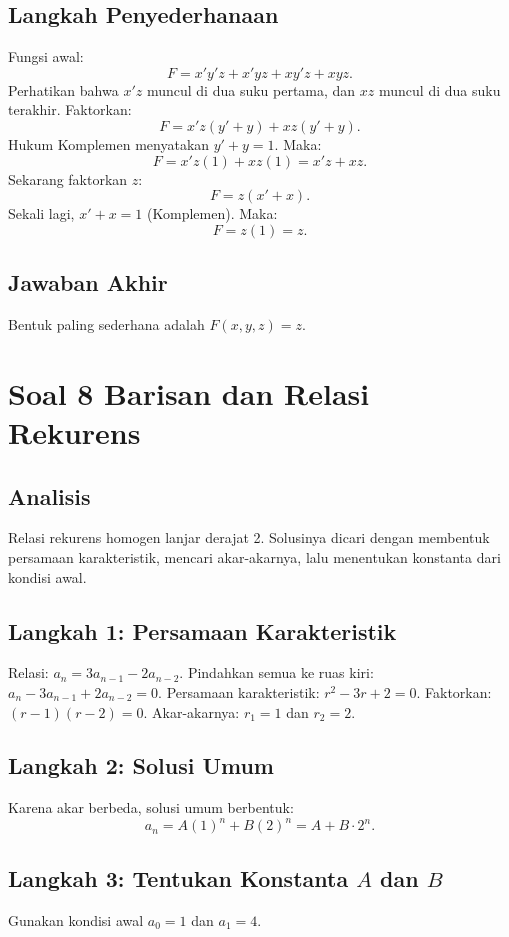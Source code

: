 \documentclass[12pt,a4paper]{article}
\begin{document}
\subsection*{Langkah Penyederhanaan}
Fungsi awal:
\[
F = x'y'z + x'yz + xy'z + xyz.
\]
Perhatikan bahwa $x'z$ muncul di dua suku pertama, dan $xz$ muncul di dua suku terakhir. Faktorkan:
\[
F = x'z(y' + y) + xz(y' + y).
\]
Hukum Komplemen menyatakan $y' + y = 1$. Maka:
\[
F = x'z(1) + xz(1) = x'z + xz.
\]
Sekarang faktorkan $z$:
\[
F = z(x' + x).
\]
Sekali lagi, $x' + x = 1$ (Komplemen). Maka:
\[
F = z(1) = z.
\]

\subsection*{Jawaban Akhir}
Bentuk paling sederhana adalah $\boxed{F(x,y,z) = z}$. 

\newpage
\section*{Soal 8 Barisan dan Relasi Rekurens}
\subsection*{Analisis}
Relasi rekurens homogen lanjar derajat 2. Solusinya dicari dengan membentuk persamaan karakteristik, mencari akar-akarnya, lalu menentukan konstanta dari kondisi awal.

\subsection*{Langkah 1: Persamaan Karakteristik}
Relasi: $a_n = 3a_{n-1} - 2a_{n-2}$.
Pindahkan semua ke ruas kiri: $a_n - 3a_{n-1} + 2a_{n-2} = 0$.
Persamaan karakteristik: $r^2 - 3r + 2 = 0$.
Faktorkan: $(r-1)(r-2) = 0$.
Akar-akarnya: $r_1 = 1$ dan $r_2 = 2$.

\subsection*{Langkah 2: Solusi Umum}
Karena akar berbeda, solusi umum berbentuk:
\[
a_n = A(1)^n + B(2)^n = A + B \cdot 2^n.
\]

\subsection*{Langkah 3: Tentukan Konstanta $A$ dan $B$}
Gunakan kondisi awal $a_0 = 1$ dan $a_1 = 4$.
\end{document}
